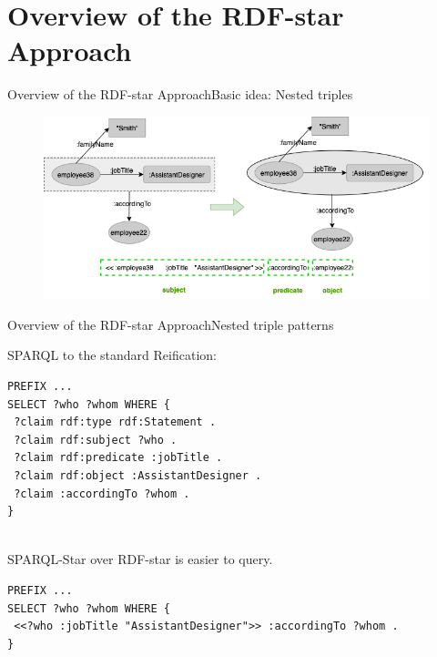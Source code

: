 \documentclass[aspectratio=169]{beamer}
\begin{document}
\section{Overview of the RDF-star Approach}
\begin{frame}{Overview of the RDF-star Approach}{Basic idea: Nested triples}
    \begin{figure}
        \centering
        \includegraphics[scale=0.5]{images/Example-2-To-Nested.png}
    \end{figure}
\end{frame}

\begin{frame}[fragile]{Overview of the RDF-star Approach}{Nested triple patterns}
\vspace{2mm}
\begin{minipage}{0.8\textwidth}
SPARQL to the standard Reification:
\begin{lstlisting}[language=SPARQL,basicstyle=\ttfamily\footnotesize]
PREFIX ...
SELECT ?who ?whom WHERE {
 ?claim rdf:type rdf:Statement .
 ?claim rdf:subject ?who .
 ?claim rdf:predicate :jobTitle .
 ?claim rdf:object :AssistantDesigner .
 ?claim :accordingTo ?whom .
}
\end{lstlisting}
\end{minipage}
\begin{minipage}{0.8\textwidth}
\centering
\end{minipage}
\\SPARQL-Star over RDF-star is easier to query.
\begin{minipage}{0.8\textwidth}
\begin{lstlisting}[language=SPARQL,basicstyle=\ttfamily\footnotesize]
PREFIX ...
SELECT ?who ?whom WHERE {
 <<?who :jobTitle "AssistantDesigner">> :accordingTo ?whom .
}
\end{lstlisting}
\end{minipage}
\end{frame}
\end{document}
